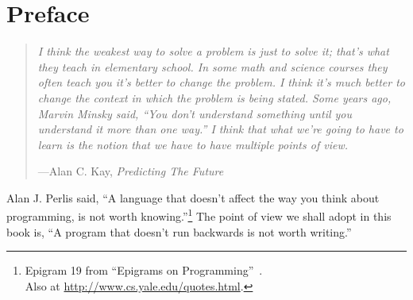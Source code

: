 \chapter{Preface}\label{sec:preface}

\vspace{-1cm}

\begin{quotation}
\noindent
\emph{I think the weakest way to solve a problem is just to solve it; that's what they teach in elementary school. In some math and science courses they often teach you it's better to change the problem. I think it's much better to change the context in which the problem is being stated. Some years ago, Marvin Minsky said, ``You don't understand something until you understand it more than one way.'' I think that what we're going to have to learn is the notion that we have to have multiple points of view.}
\begin{flushright}
\vspace{-0.5em}
---Alan C. Kay, \emph{Predicting The Future}
\end{flushright}
\end{quotation}


Alan J. Perlis said, ``A language that doesn't affect the way you think about programming, is not worth knowing.''\footnote{Epigram 19 from ``Epigrams on Programming''~\cite{Perlis:1982:SFE:947955.1083808}.\\Also at \url{http://www.cs.yale.edu/quotes.html}.}
%
The point of view we shall adopt in this book is, ``A program that doesn't run backwards is not worth writing.''

%




